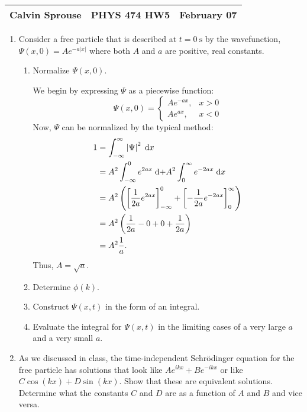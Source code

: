 \documentclass[a4paper, 12pt]{config/homework}
\begin{document}
\noindent
\begin{tabularx}{\textwidth}{>{\centering\arraybackslash}X>{\centering\arraybackslash}X>{\centering\arraybackslash}X}
Calvin Sprouse & PHYS 474 HW5 & 2024 February 07\\
\midrule
\end{tabularx}

\begin{enumerate}
\item Consider a free particle that is described at \(t=\qty{0}{\second}\) by the wavefunction, \(\Psi(x,0)=Ae^{-a|x|}\) where both \(A\) and \(a\) are positive, real constants.
\begin{enumerate}
\item Normalize \(\Psi(x,0)\).

We begin by expressing \(\Psi \) as a piecewise function:
\[\Psi(x,0) = \begin{cases}
Ae^{-ax}, & x > 0 \\ Ae^{ax}, & x < 0
\end{cases}\]
Now, \(\Psi \) can be normalized by the typical method:
\begin{align*}
1 &= \bint{-\infty}{\infty}{\left|\Psi\right|^2}{x}
\\&= A^2\bint{-\infty}{0}{e^{2ax}} + A^2\bint{0}{\infty}{e^{-2ax}}{x}
\\&= A^2\left( \left[\frac{1}{2a}e^{2ax}\right]_{-\infty}^0 + \left[-\frac{1}{2a}e^{-2ax}\right]_0^\infty \right)
\\&= A^2\left( \frac{1}{2a} - 0 + 0 + \frac{1}{2a} \right)
\\&= A^2 \frac{1}{a}.
\end{align*}
Thus, \(A=\sqrt{a}\).

\item Determine \(\phi(k)\).



\item Construct \(\Psi(x,t)\) in the form of an integral.



\item Evaluate the integral for \(\Psi(x,t)\) in the limiting cases of a very large \(a\) and a very small \(a\).



\end{enumerate}
\pagebreak
\item As we discussed in class, the time-independent Schr{\"o}dinger equation for the free particle has solutions that look like \(Ae^{ikx} + Be^{-ikx}\) or like \(C\cos(kx) + D\sin(kx)\). Show that these are equivalent solutions. Determine what the constants \(C\) and \(D\) are as a function of \(A\) and \(B\) and vice versa.




\end{enumerate}
\end{document}
